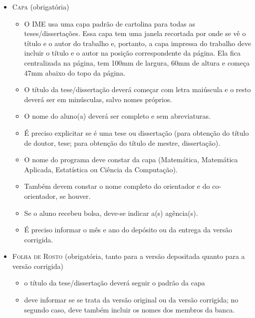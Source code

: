 \begin{itemize}
  \item \textsc{Capa} (obrigatória)
  \begin{itemize}
    \item O IME usa uma capa padrão de cartolina para todas as
    teses/dissertações.  Essa capa tem uma janela recortada por onde se
    vê o título e o autor do trabalho e, portanto, a capa impressa do
    trabalho deve incluir o título e o autor na posição correspondente da
    página. Ela fica centralizada na página, tem 100mm de largura, 60mm de
    altura e começa 47mm abaixo do topo da página.

    \item O título da tese/dissertação deverá começar com letra maiúscula
    e o resto deverá ser em minúsculas, salvo nomes próprios.

    \item O nome do aluno(a) deverá ser completo e sem abreviaturas.

    \item É preciso explicitar se é uma tese ou dissertação (para
    obtenção do título de doutor, tese; para obtenção do título de
    mestre, dissertação).

    \item O nome do programa deve constar da capa (Matemática,
    Matemática Aplicada, Estatística ou Ciência da Computação).

    \item Também devem constar o nome completo do orientador e do
    co-orientador, se houver.

    \item Se o aluno recebeu bolsa, deve-se indicar a(s) agência(s).

    \item É preciso informar o mês e ano do depósito ou da entrega da
    versão corrigida.
  \end{itemize}

  \item \textsc{Folha de Rosto} (obrigatória, tanto para a versão
  depositada quanto para a versão corrigida)
  \begin{itemize}
    \item o título da tese/dissertação deverá seguir o padrão da capa

    \item deve informar se se trata da versão original ou da versão
    corrigida; no segundo caso, deve também incluir os nomes
    dos membros da banca.
  \end{itemize}


\end{itemize}

